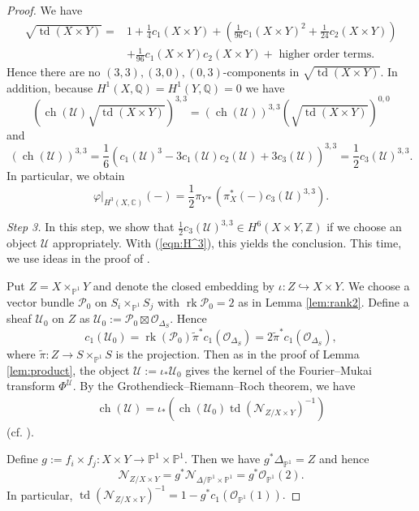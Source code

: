 \documentclass[a4paper,11pt]{article}
\theoremstyle{definition}\newtheorem{defn}[thm]{Definition}
\theoremstyle{remark}\newtheorem{remark}[thm]{Remark}
\numberwithin{equation}{section}
\newcommand{\td}{\ensuremath{\operatorname{td}}}
\newcommand{\ch}{\ensuremath{\operatorname{ch}}}
\newcommand{\rk}{\ensuremath{\operatorname{rk}}}
\newcommand{\mc}{\mathcal}
\newcommand{\fm}[1]{\ensuremath{\Phi^{#1}}}
\newcommand{\PP}{\mathbb P}
\newcommand{\Z}{\mathbb Z}
\newcommand{\Q}{\mathbb Q}
\newcommand{\C}{\mathbb C}
\begin{document}
\begin{proof}
We have 
%
\begin{align*}
\sqrt{\td (X\times Y)}=
&1+\frac{1}{4}c_1(X\times Y)+(\frac{1}{96}c_1(X\times Y)^2+\frac{1}{24}c_2(X\times Y))\\
&+\frac{1}{96}c_1(X\times Y)c_2(X\times Y)+\text{ higher order terms}.
\end{align*}
Hence there are no $(3,3),(3,0),(0,3)$-components
in $\sqrt{\td (X\times Y)}$. 
In addition, because $H^1(X,\Q)=H^1(Y,\Q)=0$
we have 
$$
(\ch (\mc U)\sqrt{\td (X\times Y)})^{3,3}= 
(\ch (\mc U))^{3,3}(\sqrt{\td (X\times Y)})^{0,0}
$$
and 
%
\begin{equation}\label{eqn:33}
(\ch(\mc U))^{3,3}=\frac{1}{6}(c_1(\mc U)^3-3c_1(\mc U)c_2(\mc U)+3c_3(\mc U))^{3,3}
=\frac{1}{2}{c_3(\mc U)}^{3,3}.
\end{equation}
%
In particular, we obtain
\begin{equation}\label{eqn:H^3}
\varphi|_{H^3(X,\C)}(-)
=\frac{1}{2}\pi_{Y*}(\pi_X^*(-){c_3(\mc U)}^{3,3}).
\end{equation}
%

\emph{Step 3.}
In this step, we show that 
$\frac{1}{2}{c_3(\mc U)}^{3,3}\in H^6(X\times Y, \Z)$ if we choose an object
$\mc U$ appropriately. 
With (\ref{eqn:H^3}), this yields the conclusion.
This time, we use ideas in the proof of \cite[Proposition 3.4]{Ca07}.  

Put $Z=X\times_{\PP^1} Y$ and denote 
the closed embedding by
$\iota\colon Z\hookrightarrow X\times Y$.
We choose a vector bundle $\mc P_0$ on 
$S_i\times_{\PP ^1} S_j$ with  $\rk\mc P_0=2$ as in  Lemma \ref{lem:rank2}. 
Define a sheaf $\mc U_0$ on $Z$ as  
$\mc U_0:=\mc P_0\boxtimes \mc O_{\Delta_{S}}.$
Hence 
$$
c_1(\mc U_0)=\rk(\mc P_0)\tilde{\pi}^*c_1(\mc O_{\Delta_{S}})
=2\tilde{\pi}^*c_1(\mc O_{\Delta_{S}}),
$$ 
where
$\tilde{\pi}\colon Z\to S\times_{\PP ^1}S$ is the projection.
Then as in the proof of  Lemma \ref{lem:product},
the object $\mc U:=\iota_* \mc U_0$ gives the kernel 
of the Fourier--Mukai transform $\fm{\mc U}$. 
By the Grothendieck--Riemann--Roch theorem, we have 
%
\begin{align}\label{al:Grot}
\ch (\mc U)=\iota_* (\ch (\mc U_0)\td (\mc N_{Z/X\times Y})^{-1})
\end{align}  
%
(cf. \cite[pp. 283]{Fu98}). 

Define $g:=f_i\times f_j \colon X\times Y \to \PP ^1\times \PP ^1$.
Then we have $g^*\Delta_{\PP ^1} =Z$
and hence  
$$
\mc N_{Z/X\times Y}=g^*\mc N_{\Delta /\PP ^1\times \PP ^1}
=g^*\mc O_{\PP  ^1}(2).
$$
In particular, 
$
\td (\mc N_{Z/X\times Y})^{-1}=1-g^*c_1(\mc O_{\PP^1}(1)).
$


\end{proof}
\end{document}
